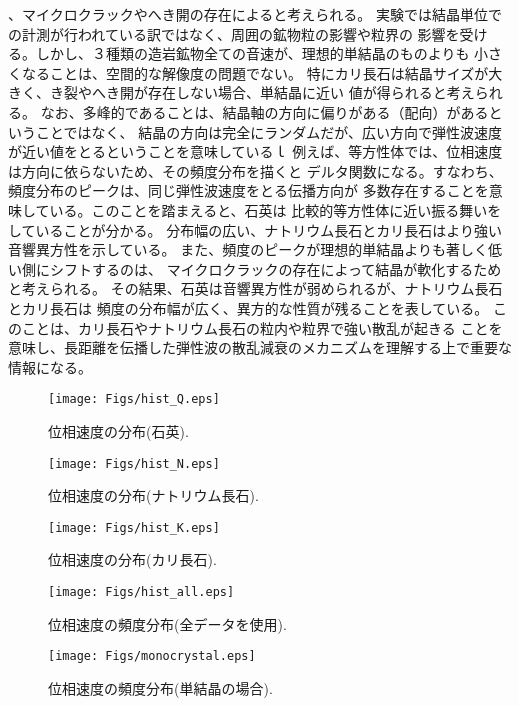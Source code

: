 、マイクロクラックやへき開の存在によると考えられる。
実験では結晶単位での計測が行われている訳ではなく、周囲の鉱物粒の影響や粒界の
影響を受ける。しかし、３種類の造岩鉱物全ての音速が、理想的単結晶のものよりも
小さくなることは、空間的な解像度の問題でない。
特にカリ長石は結晶サイズが大きく、き裂やへき開が存在しない場合、単結晶に近い
値が得られると考えられる。
なお、多峰的であることは、結晶軸の方向に偏りがある（配向）があるということではなく、
結晶の方向は完全にランダムだが、広い方向で弾性波速度が近い値をとるということを意味しているｌ
例えば、等方性体では、位相速度は方向に依らないため、その頻度分布を描くと
デルタ関数になる。すなわち、頻度分布のピークは、同じ弾性波速度をとる伝播方向が
多数存在することを意味している。このことを踏まえると、石英は
比較的等方性体に近い振る舞いをしていることが分かる。
分布幅の広い、ナトリウム長石とカリ長石はより強い音響異方性を示している。
また、頻度のピークが理想的単結晶よりも著しく低い側にシフトするのは、
マイクロクラックの存在によって結晶が軟化するためと考えられる。
その結果、石英は音響異方性が弱められるが、ナトリウム長石とカリ長石は
頻度の分布幅が広く、異方的な性質が残ることを表している。
このことは、カリ長石やナトリウム長石の粒内や粒界で強い散乱が起きる
ことを意味し、長距離を伝播した弾性波の散乱減衰のメカニズムを理解する上で重要な情報になる。
\begin{figure}
\begin{center}
	\texttt{[image: Figs/hist\_Q.eps]}
	\caption{位相速度の分布(石英).}
	\label{fig:fig10}
\end{center}
	\vspace{-10mm}
\end{figure}
\begin{figure}
\begin{center}
	\texttt{[image: Figs/hist\_N.eps]}
	\caption{位相速度の分布(ナトリウム長石).}
	\label{fig:fig11}
\end{center}
	\vspace{-10mm}
\end{figure}
\begin{figure}
\begin{center}
	\texttt{[image: Figs/hist\_K.eps]}
	\caption{位相速度の分布(カリ長石).}
	\label{fig:fig12}
\end{center}
	\vspace{-10mm}
\end{figure}
\begin{figure}
\begin{center}
	\texttt{[image: Figs/hist\_all.eps]}
	\caption{位相速度の頻度分布(全データを使用).}
	\label{fig:fig13}
\end{center}
	\vspace{-10mm}
\end{figure}
\begin{figure}
\begin{center}
	\texttt{[image: Figs/monocrystal.eps]}
	\caption{位相速度の頻度分布(単結晶の場合).}
	\label{fig:fig14}
\end{center}
	\vspace{-10mm}
\end{figure}
